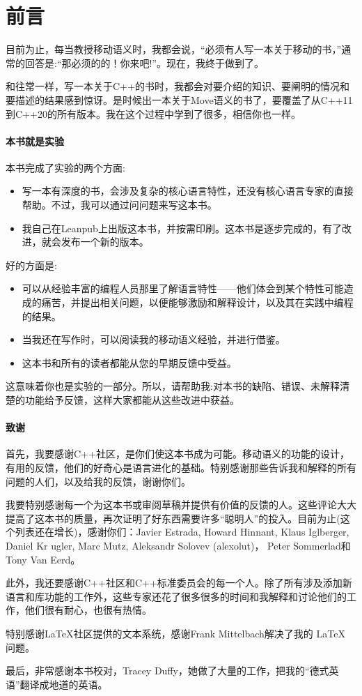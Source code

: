 \chapter{前言}

目前为止，每当教授移动语义时，我都会说，“必须有人写一本关于移动的书，”通常的回答是:“那必须的的！你来吧!”。现在，我终于做到了。

和往常一样，写一本关于C++的书时，我都会对要介绍的知识、要阐明的情况和要描述的结果感到惊讶。是时候出一本关于Move语义的书了，要覆盖了从C++11到C++20的所有版本。我在这个过程中学到了很多，相信你也一样。

\subsubsection{本书就是实验}

本书完成了实验的两个方面:
\begin{itemize}
	\item 写一本有深度的书，会涉及复杂的核心语言特性，还没有核心语言专家的直接帮助。不过，我可以通过问问题来写这本书。
	\item 我自己在Leanpub上出版这本书，并按需印刷。这本书是逐步完成的，有了改进，就会发布一个新的版本。
\end{itemize}

好的方面是:
\begin{itemize}
	\item 可以从经验丰富的编程人员那里了解语言特性——他们体会到某个特性可能造成的痛苦，并提出相关问题，以便能够激励和解释设计，以及其在实践中编程的结果。
	\item 当我还在写作时，可以阅读我的移动语义经验，并进行借鉴。
	\item 这本书和所有的读者都能从您的早期反馈中受益。
\end{itemize}

这意味着你也是实验的一部分。所以，请帮助我:对本书的缺陷、错误、未解释清楚的功能给予反馈，这样大家都能从这些改进中获益。

\subsubsection{致谢}

首先，我要感谢C++社区，是你们使这本书成为可能。移动语义的功能的设计，有用的反馈，他们的好奇心是语言进化的基础。特别感谢那些告诉我和解释的所有问题的人们，以及给我的反馈，谢谢你们。

我要特别感谢每一个为这本书或审阅草稿并提供有价值的反馈的人。这些评论大大提高了这本书的质量，再次证明了好东西需要许多“聪明人”的投入。目前为止(这个列表还在增长)，感谢你们：Javier Estrada, Howard Hinnant, Klaus Iglberger, Daniel Kr ugler, Marc Mutz, Aleksandr Solovev (alexolut)， Peter Sommerlad和Tony Van Eerd。

此外，我还要感谢C++社区和C++标准委员会的每一个人。除了所有涉及添加新语言和库功能的工作外，这些专家还花了很多很多的时间和我解释和讨论他们的工作，他们很有耐心，也很有热情。

特别感谢LaTeX社区提供的文本系统，感谢Frank Mittelbach解决了我的 \LaTeX{} 问题。

最后，非常感谢本书校对，Tracey Duffy，她做了大量的工作，把我的“德式英语”翻译成地道的英语。


















